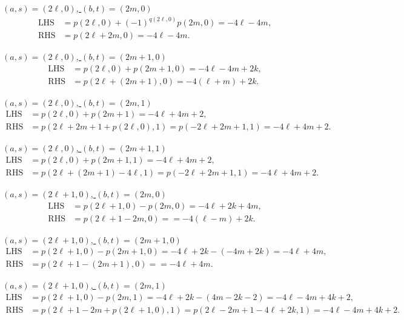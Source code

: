 \documentclass[12pt]{amsart}
\theoremstyle{definition}
\begin{document}
{\tiny
\noindent\underline{$(a,s)=(2\ell,0)$, $(b,t)=(2m,0)$}
\begin{align*}
  \text{LHS} &= p(2\ell,0)+(-1)^{q(2\ell,0)}p(2m,0)=-4\ell-4m,\\
  \text{RHS} &= p(2\ell+2m,0)=-4\ell-4m.
\end{align*}

\noindent\underline{$(a,s)=(2\ell,0)$, $(b,t)=(2m+1,0)$}
\begin{align*}
  \text{LHS} &= p(2\ell,0)+p(2m+1,0)=-4\ell-4m+2k,\\
  \text{RHS} &= p(2\ell+(2m+1),0)=-4(\ell+m)+2k.
\end{align*}

\noindent\underline{$(a,s)=(2\ell,0)$, $(b,t)=(2m,1)$}
\begin{align*}
  \text{LHS} &= p(2\ell,0)+p(2m+1)=-4\ell+4m+2, \\
  \text{RHS} &= p(2\ell+2m+1+p(2\ell,0),1)=p(-2\ell+2m+1,1)= -4\ell+4m+2.
\end{align*}

\noindent\underline{$(a,s)=(2\ell,0)$, $(b,t)=(2m+1,1)$}
\begin{align*}
  \text{LHS} &= p(2\ell,0)+p(2m+1,1)=-4\ell+4m+2,\\
  \text{RHS} &= p(2\ell+(2m+1)-4\ell,1)=p(-2\ell+2m+1,1)= -4\ell+4m+2.
\end{align*}

\noindent\underline{$(a,s)=(2\ell+1,0)$, $(b,t)=(2m,0)$}
\begin{align*}
  \text{LHS} &= p(2\ell+1,0)-p(2m,0)=-4\ell+2k+4m,\\
  \text{RHS} &= p(2\ell+1-2m,0)==-4(\ell-m)+2k.
\end{align*}

\noindent\underline{$(a,s)=(2\ell+1,0)$, $(b,t)=(2m+1,0)$}
\begin{align*}
  \text{LHS} &= p(2\ell+1,0)-p(2m+1,0)=-4\ell+2k-(-4m+2k)=-4\ell+4m,\\
  \text{RHS} &= p(2\ell+1-(2m+1),0)==-4\ell+4m.
\end{align*}

\noindent\underline{$(a,s)=(2\ell+1,0)$, $(b,t)=(2m,1)$}
\begin{align*}
  \text{LHS} &= p(2\ell+1,0)-p(2m,1)=-4\ell+2k-(4m-2k-2)=-4\ell-4m+4k+2,\\
  \text{RHS} &= p(2\ell+1-2m+p(2\ell+1,0),1)= p(2\ell-2m+1-4\ell+2k,1)
                                   =-4\ell-4m+4k+2.
\end{align*}

}
\end{document}
